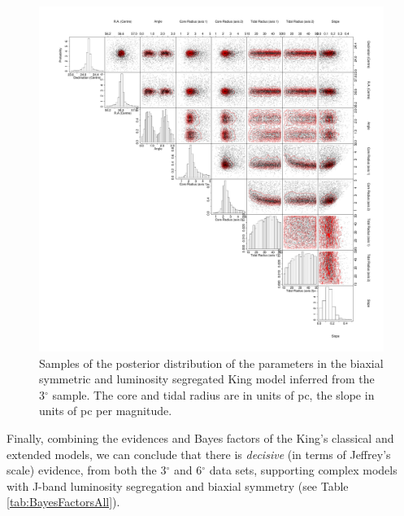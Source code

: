 \begin{figure}[H]
 \centering
  \includegraphics[width=\textwidth]{background/Figures/PSD/KingBS7.pdf}
  \caption{Samples of the posterior distribution of the parameters in the biaxial symmetric and luminosity segregated King model inferred from the 3$^{\circ}$ sample. The core and tidal radius are in units of pc, the slope in units of pc per magnitude.}
\label{fig:KingBS7}
\end {figure}

Finally, combining the evidences and Bayes factors of the King's classical and extended models, we can conclude that there is \emph{decisive} (in terms of Jeffrey's scale) evidence, from both the 3$^{\circ}$  and 6$^{\circ}$ data sets, supporting complex models with J-band luminosity segregation and biaxial symmetry (see Table \ref{tab:BayesFactorsAll}).

